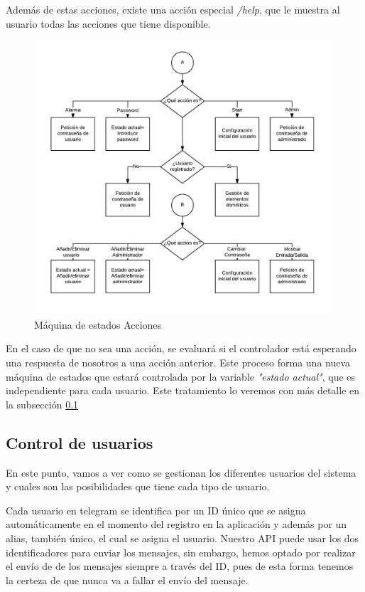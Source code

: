 \documentclass[10pt,journal,compsoc]{IEEEtran}
\begin{document}
Además de estas acciones, existe una acción especial \textit{/help}, que le muestra al usuario todas las acciones que tiene disponible.

\begin{figure}[h]
\centering
\includegraphics[scale=0.4]{MaqEstAcc}
\caption{Máquina de estados Acciones}
\label{fig:MaqEstAcc}
\end{figure}

En el caso de que no sea una acción, se evaluará si el controlador está esperando una respuesta de nosotros a una acción anterior. Este proceso forma una nueva máquina de estados que estará controlada por la variable \textit{"estado actual"}, que es independiente para cada usuario.
Este tratamiento lo veremos con más detalle en la subsección \ref{sec:ControlUsuarios}

\subsection{Control de usuarios}\label{sec:ControlUsuarios}

En este punto, vamos a ver como se gestionan los diferentes usuarios del sistema y cuales son las posibilidades que tiene cada tipo de usuario.

Cada usuario en telegram se identifica por un ID único que se asigna automáticamente en el momento del registro en la aplicación y además por un alias, también único, el cual se asigna el usuario. Nuestro API puede usar los dos identificadores para enviar los  mensajes, sin embargo, hemos optado por realizar el envío de de los mensajes siempre a través del ID, pues de esta forma tenemos la certeza de que nunca va a fallar el envío del mensaje. 
\end{document}
